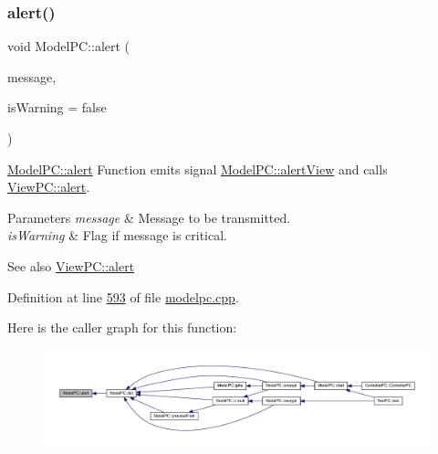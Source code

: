 \subsubsection{\texorpdfstring{alert()}{alert()}}
{\footnotesize\ttfamily void Model\+P\+C\+::alert (\begin{DoxyParamCaption}\item[{Q\+String}]{message,  }\item[{bool}]{is\+Warning = {\ttfamily false} }\end{DoxyParamCaption})}



\mbox{\hyperlink{class_model_p_c_a9079a101d83672aa48fd2dbac797de40}{Model\+P\+C\+::alert}} Function emits signal \mbox{\hyperlink{class_model_p_c_aef1f058227af54e4cfc9fc4c4397d30c}{Model\+P\+C\+::alert\+View}} and calls \mbox{\hyperlink{class_view_p_c_a7c467169467789561078abc9d4fe57bd}{View\+P\+C\+::alert}}. 


\begin{DoxyParams}{Parameters}
{\em message} & Message to be transmitted. \\
\hline
{\em is\+Warning} & Flag if message is critical. \\
\hline
\end{DoxyParams}
\begin{DoxySeeAlso}{See also}
\mbox{\hyperlink{class_view_p_c_a7c467169467789561078abc9d4fe57bd}{View\+P\+C\+::alert}} 
\end{DoxySeeAlso}


Definition at line \mbox{\hyperlink{modelpc_8cpp_source_l00593}{593}} of file \mbox{\hyperlink{modelpc_8cpp_source}{modelpc.\+cpp}}.

Here is the caller graph for this function\+:
\nopagebreak
\begin{figure}[H]
\begin{center}
\leavevmode
\includegraphics[width=350pt]{class_model_p_c_a9079a101d83672aa48fd2dbac797de40_icgraph}
\end{center}
\end{figure}
\mbox{\label{class_model_p_c_aef1f058227af54e4cfc9fc4c4397d30c}} 
